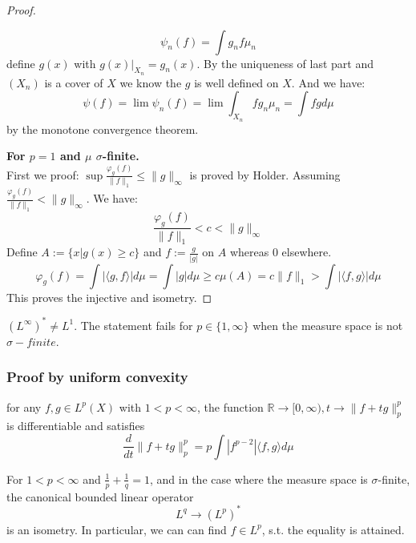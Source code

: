 \begin{proof}
\begin{itemize}
			\begin{equation*}
				\psi_n(f) = \int g_n f \mu_n
			\end{equation*}
			define $g(x)$ with $g(x)|_{X_n} = g_n(x)$. By the uniqueness of last part and $(X_n)$ is a cover of $X$ we know the $g$ is well defined on $X$. And we have:
			\begin{equation*}
				\psi(f) = \lim \psi_n(f) = \lim \int_{X_n}f g_n \mu_n= \int f gd\mu
			\end{equation*}           
			by the monotone convergence theorem.
	\end{itemize}
	\textbf{For $p = 1$ and $\mu$ $\sigma$-finite.} \\
	First we proof:
	$\sup \frac{\varphi_g(f)}{\|f\|_1} \leq \|g\|_\infty$ is proved by Holder. Assuming $\frac{\varphi_g(f)}{\|f\|_1} < \|g\|_\infty$. We have:
	\begin{equation*}
		\frac{\varphi_g(f)}{\|f\|_1} < c < \|g\|_\infty
	\end{equation*}
	Define $A := \{x| g(x) \geq c\}$ and $f := \frac{g}{|g|}$ on $A$ whereas 0 elsewhere.
	\begin{equation*}
		\varphi_g(f) = \int | \langle g, f \rangle| d\mu = \int |g| d\mu
		\geq c \mu(A) = c\|f\|_1 > \int |\langle f, g \rangle|   d\mu
 	\end{equation*}
 	This proves the injective and isometry.
\end{proof}
\begin{remark}
	 $(L^\infty)^* \neq L^1$.  The statement fails for $p \in \{1, \infty\}$ when the measure space is not $\sigma-finite$.
\end{remark}

\subsubsection*{Proof by uniform convexity}
\begin{lemma}
	for any $f, g \in L^p(X)$ with $1 < p < \infty$, the function $\mathbb{R} \rightarrow [0, \infty), t \rightarrow \|f + tg\|^p_p$ is differentiable and satisfies
	\begin{equation*}
		\frac{d}{dt} \|f + tg\|^p_p = p\int |f^{p -2}|\langle f, g\rangle d\mu
	\end{equation*}
\end{lemma}

\begin{lemma}
	For $1 < p < \infty$ and $\frac{1}{p} + \frac{1}{q} = 1$, and in the case where the measure space is $\sigma$-finite, the canonical bounded linear operator
	\begin{equation*}
		L^q \rightarrow (L^p)^*
	\end{equation*}
	 is an isometry. In particular, we can can find $f\in L^p$, s.t. the equality is attained.
\end{lemma}

